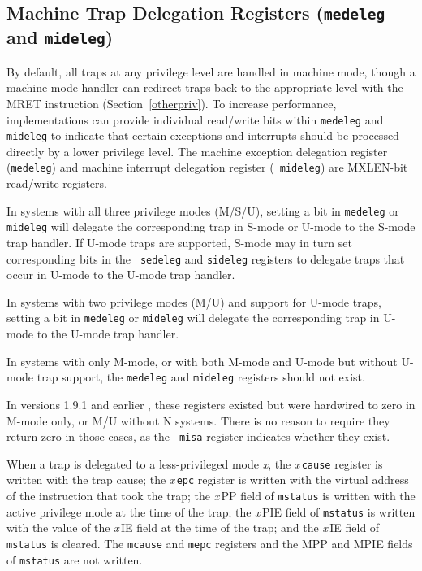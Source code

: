 \subsection{Machine Trap Delegation Registers ({\tt medeleg} and {\tt mideleg})}

By default, all traps at any privilege level are handled in machine
mode, though a machine-mode handler can redirect traps back to the
appropriate level with the MRET instruction (Section~\ref{otherpriv}).
To increase performance, implementations can provide individual
read/write bits within {\tt medeleg} and {\tt mideleg} to indicate
that certain exceptions and interrupts should be processed directly by
a lower privilege level.  The machine exception delegation register
({\tt medeleg}) and machine interrupt delegation register ({\tt
  mideleg}) are MXLEN-bit read/write registers.

In systems with all three privilege modes (M/S/U), setting a bit in
{\tt medeleg} or {\tt mideleg} will delegate the corresponding trap in
S-mode or U-mode to the S-mode trap handler. If U-mode traps are
supported, S-mode may in turn set corresponding bits in the {\tt
  sedeleg} and {\tt sideleg} registers to delegate traps that occur in
U-mode to the U-mode trap handler.

In systems with two privilege modes (M/U) and support for U-mode
traps, setting a bit in {\tt medeleg} or {\tt mideleg} will
delegate the corresponding trap in U-mode to the U-mode trap handler.

In systems with only M-mode, or with both M-mode and U-mode but
without U-mode trap support, the {\tt medeleg} and {\tt mideleg}
registers should not exist.
\begin{commentary}
  In versions 1.9.1 and earlier , these registers existed but were
  hardwired to zero in M-mode only, or M/U without N systems.  There
  is no reason to require they return zero in those cases, as the {\tt
    misa} register indicates whether they exist.
\end{commentary}


When a trap is delegated to a less-privileged mode {\em x}, the
{\em x}\,{\tt cause} register is written with the trap cause; the
{\em x}\,{\tt epc} register is written with the virtual address of
the instruction that took the trap; the {\em x}\,PP field
of {\tt mstatus} is written with the active privilege mode at the time of
the trap; the {\em x}\,PIE field of {\tt mstatus} is written with the
value of the {\em x}\,IE field at the time of the trap; and
the {\em x}\,IE field of {\tt mstatus} is cleared.  The {\tt mcause} and
{\tt mepc} registers and the MPP and MPIE fields of {\tt mstatus} are
not written.

